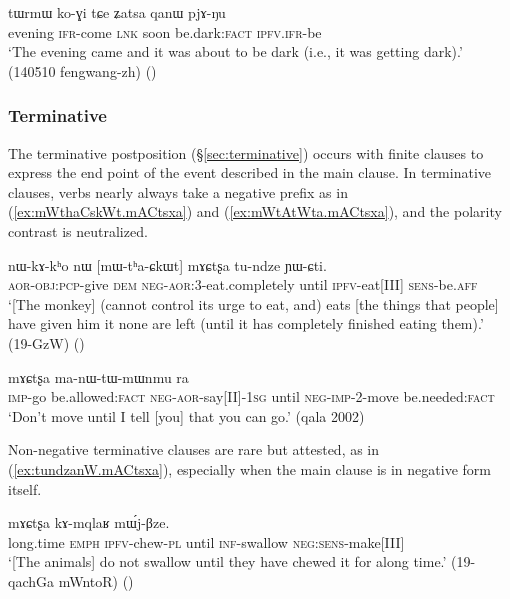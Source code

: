 \begin{exe}
\ex \label{ex:qanW.pjANu}
\gll  tɯrmɯ ko-ɣi tɕe ʑatsa qanɯ pjɤ-ŋu \\
evening \textsc{ifr}-come \textsc{lnk} soon be.dark:\textsc{fact} \textsc{ipfv}.\textsc{ifr}-be \\
\glt `The evening came and it was about to be dark (i.e., it was getting dark).' (140510 fengwang-zh)
()
\end{exe}

 \subsubsection{Terminative} \label{sec:terminative.clause}
The terminative postposition    (§\ref{sec:terminative}) occurs with finite clauses to express the end point of the event described in the main clause. In terminative clauses, verbs nearly always take a negative prefix as in (\ref{ex:mWthaCskWt.mACtsxa}) and (\ref{ex:mWtAtWta.mACtsxa}), and the polarity contrast is neutralized.

\begin{exe}
\ex \label{ex:mWthaCskWt.mACtsxa}
\gll nɯ-kɤ-kʰo nɯ [mɯ-tʰa-ɕkɯt] mɤɕtʂa tu-ndze ɲɯ-ɕti. \\
\textsc{aor}-\textsc{obj}:\textsc{pcp}-give \textsc{dem} \textsc{neg}-\textsc{aor}:3\flobv{}-eat.completely until \textsc{ipfv}-eat[III] \textsc{sens}-be.\textsc{aff} \\
\glt `[The monkey] (cannot control its urge to eat, and) eats [the things that people] have given him it none are left (until it has completely finished eating them).' (19-GzW)
()
\end{exe}

\begin{exe}
\ex \label{ex:mWtAtWta.mACtsxa}
 mɤɕtʂa ma-nɯ-tɯ-mɯnmu ra \\
\textsc{imp}-go be.allowed:\textsc{fact} \textsc{neg}-\textsc{aor}-say[II]-\textsc{1sg} until \textsc{neg}-\textsc{imp}-2-move be.needed:\textsc{fact} \\
\glt `Don't move until I tell [you] that you can go.' (qala 2002)
\end{exe}

Non-negative terminative clauses are rare but attested, as in (\ref{ex:tundzanW.mACtsxa}), especially when the main clause is in negative form itself.

\begin{exe}
\ex \label{ex:tundzanW.mACtsxa}
 mɤɕtʂa kɤ-mqlaʁ mɯ́j-βze. \\
long.time \textsc{emph} \textsc{ipfv}-chew-\textsc{pl} until \textsc{inf}-swallow \textsc{neg}:\textsc{sens}-make[III] \\
\glt `[The animals] do not swallow until they have chewed it for along time.' (19-qachGa mWntoR)
()
\end{exe}

